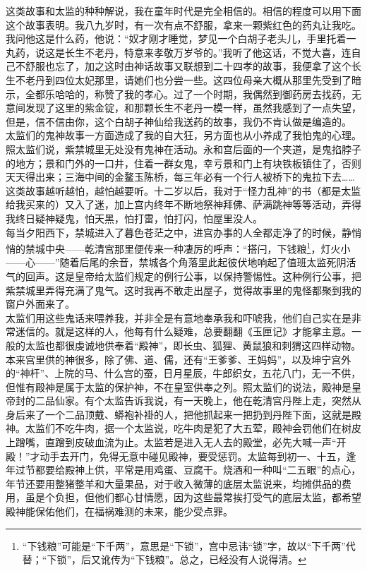 这类故事和太监的种种解说，我在童年时代是完全相信的。相信的程度可以用下面这个故事表明。我八九岁时，有一次有点不舒服，拿来一颗紫红色的药丸让我吃。我问他这是什么药，他说：“奴才刚才睡觉，梦见一个白胡子老头儿，手里托着一丸药，说这是长生不老丹，特意来孝敬万岁爷的。”我听了他这话，不觉大喜，连自己不舒服也忘了，加之这时由神话故事又联想到二十四孝的故事，我便拿了这个长生不老丹到四位太妃那里，请她们也分尝一些。这四位母亲大概从那里先受到了暗示，全都乐哈哈的，称赞了我的孝心。过了一个时期，我偶然到御药房去找药，无意间发现了这里的紫金锭，和那颗长生不老丹一模一样，虽然我感到了一点失望，但是，信不信由你，这个白胡子神仙给我送药的故事，我仍不肯认做是编造的。\\

太监们的鬼神故事一方面造成了我的自大狂，另方面也从小养成了我怕鬼的心理。照太监们说，紫禁城里无处没有鬼神在活动。永和宫后面的一个夹道，是鬼掐脖子的地方；景和门外的一口井，住着一群女鬼，幸亏景和门上有块铁板镇住了，否则天天得出来；三海中间的金鳌玉陈桥，每三年必有一个行人被桥下的鬼拉下去……这类故事越听越怕，越怕越要听。十二岁以后，我对于“怪力乱神”的书（都是太监给我买来的）又入了迷，加上宫内终年不断地祭神拜佛、萨满跳神等等活动，弄得我终日疑神疑鬼，怕天黑，怕打雷，怕打闪，怕屋里没人。\\

每当夕阳西下，禁城进入了暮色苍茫之中，进宫办事的人全都走净了的时候，静悄悄的禁城中央——乾清宫那里便传来一种凄厉的呼声：“搭闩，下钱粮\footnote{“下钱粮”可能是“下千两”，意思是“下锁”，宫中忌讳“锁”字，故以“下千两”代替；“下锁”，后又讹传为“下钱粮”。总之，已经没有人说得清。}，灯火小——心——”随着后尾的余音，禁城各个角落里此起彼伏地响起了值班太监死阴活气的回声。这是皇帝给太监们规定的例行公事，以保持警惕性。这种例行公事，把紫禁城里弄得充满了鬼气。这时我再不敢走出屋子，觉得故事里的鬼怪都聚到我的窗户外面来了。\\

太监们用这些鬼话来喂养我，并非全是有意地奉承我和吓唬我，他们自己实在是非常迷信的。就是这样的人，他每有什么疑难，总要翻翻《玉匣记》才能拿主意。一般的太监也都很虔诚地供奉着“殿神”，即长虫、狐狸、黄鼠狼和刺猬这四样动物。本来宫里供的神很多，除了佛、道、儒，还有“王爹爹、王妈妈”，以及坤宁宫外的“神杆”、上院的马、什么宫的蚕，日月星辰，牛郎织女，五花八门，无一不供，但惟有殿神是属于太监的保护神，不在皇室供奉之列。照太监们的说法，殿神是皇帝封的二品仙家。有个太监告诉我说，有一天晚上，他在乾清宫丹陛上走，突然从身后来了一个二品顶戴、蟒袍补褂的人，把他抓起来一把扔到丹陛下面，这就是殿神。太监们不吃牛肉，据一个太监说，吃牛肉是犯了大五荤，殿神会罚他们在树皮上蹭嘴，直蹭到皮破血流为止。太监若是进入无人去的殿堂，必先大喊一声“开殿！”才动手去开门，免得无意中碰见殿神，要受惩罚。太监每到初一、十五，逢年过节都要给殿神上供，平常是用鸡蛋、豆腐干。烧酒和一种叫“二五眼”的点心，年节还要用整猪整羊和大量果品，对于收入微薄的底层太监说来，均摊供品的费用，虽是个负担，但他们都心甘情愿，因为这些最常挨打受气的底层太监，都希望殿神能保佑他们，在福祸难测的未来，能少受点罪。\\

